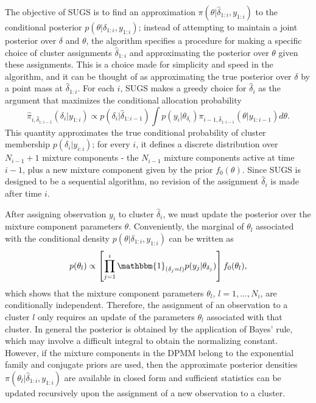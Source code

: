 \documentclass{uwstat572}
\begin{document}
The objective of SUGS is to find an approximation $\pi(\theta | \hat{\delta}_{1:i},y_{1:i})$ to the conditional posterior $p(\theta | \delta_{1:i},y_{1:i})$; instead of attempting to maintain a joint posterior over $\delta$ and $\theta$, the algorithm specifies a procedure for making a specific choice of cluster assignments $\hat{\delta}_{1:i}$ and approximating the posterior over $\theta$ given these assignments. This is a choice made for simplicity and speed in the algorithm, and it can be thought of as approximating the true posterior over $\delta$ by a point mass at $\hat{\delta}_{1:i}$. For each $i$, SUGS makes a greedy choice for $\hat{\delta}_{i}$ as the argument that maximizes the conditional allocation probability 
$$ \hat{\pi}_{i,\hat{\delta}_{1:i-1}}(\delta_i | y_{1:i}) \propto p(\delta_{i} | \hat{\delta}_{1:i-1}) \int p(y_i | \theta_{\delta_i}) \pi_{i-1,\hat{\delta}_{1:i-1}}(\theta | y_{1:i-1}) d\theta. $$
This quantity approximates the true conditional probability of cluster membership $p(\delta_i | y_{i:i})$; for every $i$, it defines a discrete distribution over $N_{i-1}+1$ mixture components - the $N_{i-1}$ mixture components active at time $i-1$, plus a new mixture component given by the prior $f_0(\theta)$. Since SUGS is designed to be a sequential algorithm, no revision of the assignment $\hat{\delta}_i$ is made after time $i$. 

After assigning observation $y_i$ to cluster $\hat{\delta}_i$, we must update the posterior over the mixture component parameters $\theta$. Conveniently, the marginal of $\theta_l$ associated with the conditional density $p(\theta | \delta_{1:i},y_{1:i})$ can be written as
\begin{align}
p(\theta_l) \propto \left[ \prod_{j=1}^i \mathbbm{1}_{(\delta_j = l)} p(y_j | \theta_{\delta_j}) \right] f_0(\theta_l), \nonumber
\end{align}
which shows that the mixture component parameters $\theta_l$, $l = 1,...,N_i$, are conditionally independent. Therefore, the assignment of an observation to a cluster $l$ only requires an update of the parameters $\theta_l$ associated with that cluster. In general the posterior is obtained by the application of Bayes' rule, which may involve a difficult integral to obtain the normalizing constant. However, if the mixture components in the DPMM belong to the exponential family and conjugate priors are used, then the approximate posterior densities $\pi(\theta_l |  \hat{\delta}_{1:i},y_{1:i})$ are available in closed form and sufficient statistics can be updated recursively upon the assignment of a new observation to a cluster.
\end{document}
